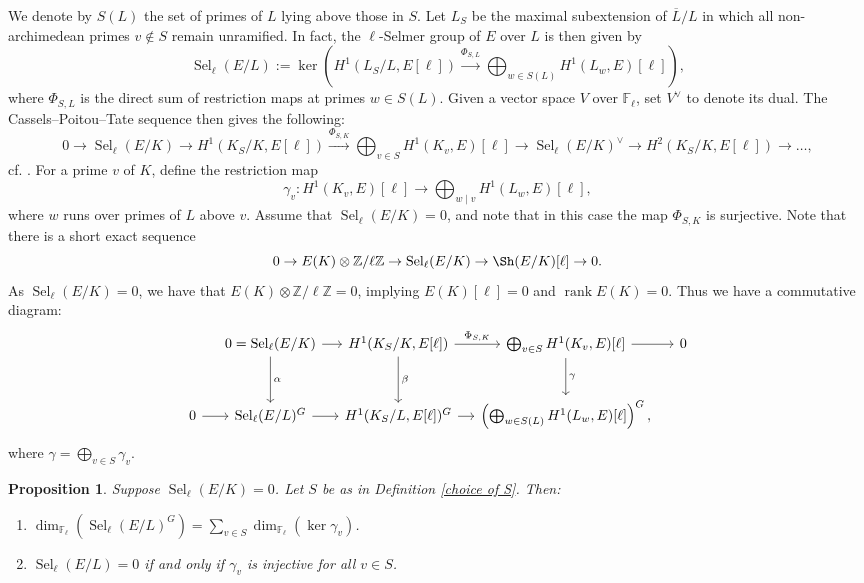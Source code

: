 \documentclass[11pt,reqno]{amsart}
\newtheorem{proposition}[theorem]{Proposition}
\newcommand{\Z}{\mathbb{Z}}
\newcommand{\F}{\mathbb{F}}
\newcommand{\op}[1]{\operatorname{#1}}
\numberwithin{equation}{section}
\begin{document}
We denote by \( S(L) \) the set of primes of \( L \) lying above those in \( S \). Let \( L_S \) be the maximal subextension of \( \overline{L}/L \) in which all non-archimedean primes \( v \notin S \) remain unramified. In fact, the \( \ell\)-Selmer group of \( E \) over \( L \) is then given by
\[
\op{Sel}_\ell(E/L) := \ker\left(H^1(L_S/L, E[\ell]) \xrightarrow{\Phi_{S,L}} \bigoplus_{w\in S(L)} H^1(L_w, E)[\ell] \right),
\]
where \( \Phi_{S,L} \) is the direct sum of restriction maps at primes \( w \in S(L) \). Given a vector space $V$ over $\F_\ell$, set $V^\vee$ to denote its dual. The Cassels--Poitou--Tate sequence then gives the following:
\[
0 \to \op{Sel}_\ell(E/K) \to H^1(K_S/K, E[\ell]) \xrightarrow{\Phi_{S,K}} \bigoplus_{v\in S} H^1(K_v, E)[\ell] \to \op{Sel}_\ell(E/K)^\vee \to H^2(K_S/K, E[\ell]) \to \dots,
\]
cf. \cite[p.8]{GCEC}. For a prime \( v \) of \( K \), define the restriction map
\[
\gamma_v: H^1(K_v, E)[\ell] \to \bigoplus_{w \mid v} H^1(L_w, E)[\ell],
\]
where \( w \) runs over primes of \( L \) above \( v \). Assume that \( \op{Sel}_\ell(E/K) = 0 \), and note that in this case the map \( \Phi_{S,K} \) is surjective. Note that there is a short exact sequence 
\[0\rightarrow E(K)\otimes \Z/\ell \Z\rightarrow \op{Sel}_\ell(E/K)\rightarrow \Sh(E/K)[\ell]\rightarrow 0. \]  As $\op{Sel}_\ell(E/K)=0$, we have that \( E(K) \otimes \mathbb{Z}/\ell \mathbb{Z} = 0 \), implying \( E(K)[\ell] = 0 \) and \( \op{rank} E(K) = 0 \). Thus we have a commutative diagram:
\begin{equation}\label{main commutative diagram}
\begin{tikzcd}[column sep = small, row sep = large]
& 0 = \op{Sel}_\ell(E/K) \arrow{r}\arrow{d}{\alpha} & H^1(K_S/K, E[\ell])\arrow{r}{\Phi_{S,K}} \arrow{d}{\beta} & \bigoplus_{v\in S} H^1(K_v, E)[\ell] \arrow{d}{\gamma} \arrow{r} & 0 \\
0\arrow{r} & \op{Sel}_\ell(E/L)^G\arrow{r} & H^1(K_S/L, E[\ell])^G\arrow{r}  &\left(\bigoplus_{w\in S(L)} H^1(L_w, E)[\ell]\right)^G,
\end{tikzcd}
\end{equation}
where \( \gamma = \bigoplus_{v \in S} \gamma_v \). 


\begin{proposition}\label{vanishing of selmer propn}
Suppose \( \op{Sel}_\ell(E/K) = 0 \). Let \( S \) be as in Definition \ref{choice of S}. Then:
\begin{enumerate}
    \item[(i)] \( \dim_{\F_\ell}(\op{Sel}_\ell(E/L)^G) = \sum_{v \in S} \dim_{\F_\ell}(\ker \gamma_v) \).
    \item[(ii)] \( \op{Sel}_\ell(E/L) = 0 \) if and only if \( \gamma_v \) is injective for all \( v \in S \).
\end{enumerate}
\end{proposition}
\end{document}
